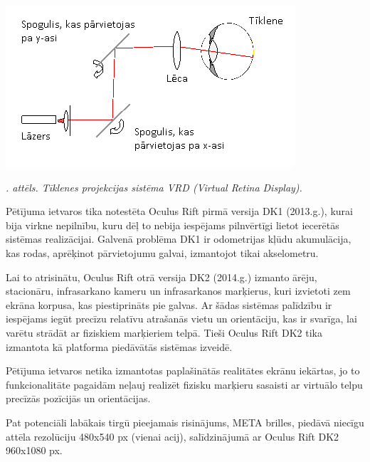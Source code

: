 \documentclass[12pt, a4paper, oneside, openright]{article}
\renewcommand{\thecimages}{\arabic{cimages}}
\begin{document}
\begin{itemize}

\label{cimages:retina_display}
\vspace{10pt}
\begin{samepage}
\begin{center}
\includegraphics[width=0.6\columnwidth]{images/retina_display.png}
\begin{center}
\footnotesize{
\textit{\thecimages. attēls. Tīklenes projekcijas sistēma VRD (\textit{Virtual Retina Display}).}}
\end{center}
\end{center}
\end{samepage}


\end{itemize}
\par
Pētījuma ietvaros tika notestēta Oculus Rift pirmā versija DK1 (2013.g.), kurai bija
virkne nepilnību, kuru dēļ to nebija iespējams pilnvērtīgi lietot iecerētās sistēmas realizācijai.
Galvenā problēma DK1 ir odometrijas kļūdu akumulācija, kas rodas, aprēķinot pārvietojumu galvai, 
izmantojot tikai akselometru. 
\par
Lai to atrisinātu, Oculus Rift otrā versija DK2 (2014.g.) izmanto ārēju, stacionāru, 
infrasarkano kameru un infrasarkanos marķierus, kuri izvietoti zem ekrāna korpusa, 
kas piestiprināts pie galvas. Ar šādas sistēmas palīdzību ir iespējams iegūt precīzu relatīvu
atrašanās vietu un orientāciju, kas ir svarīga, lai varētu strādāt ar fiziskiem marķieriem telpā.
Tieši Oculus Rift DK2 tika izmantota kā platforma piedāvātās sistēmas izveidē.
\par
Pētījuma ietvaros netika izmantotas paplašinātās realitātes ekrānu iekārtas, jo to funkcionalitāte
pagaidām neļauj realizēt fizisku marķieru sasaisti ar virtuālo telpu precīzās pozīcijās un orientācijas.
\par
Pat potenciāli labākais tirgū pieejamais risinājums, META brilles, piedāvā niecīgu attēla rezolūciju 480x540 px (vienai acij),
salīdzinājumā ar Oculus Rift DK2 \\ 960x1080 px. 
\end{document}
